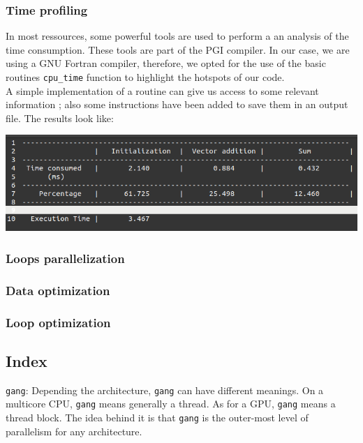 \documentclass[10pt,a4paper]{article}
\newcommand{\code}[1]{\colorbox{light-gray}{\texttt{#1}}}
\begin{document}
\subsubsection{Time profiling}
In most ressources, some powerful tools are used to perform a an analysis of the time consumption. These tools are part of the PGI compiler. In our case, we are using a GNU Fortran compiler, therefore, we opted for the use of the basic routines \code{cpu\_time} function to highlight the hotspots of our code.\\
A simple implementation of a routine can give us access to some relevant information ; also some instructions have been added to save them in an output file. The results look like:
\begin{center}
\includegraphics[scale=0.5]{serial_data.png}
\end{center}

\subsubsection{Loops parallelization}

\subsubsection{Data optimization}

\subsubsection{Loop optimization}


\subsection{Index}
\code{gang}: Depending the architecture, \code{gang} can have different meanings. On a multicore CPU, \code{gang} means generally a thread. As for a GPU, \code{gang} means a thread block. The idea behind it is that \code{gang} is the outer-most level of parallelism for any architecture.
\end{document}
